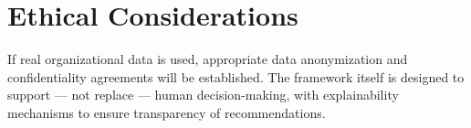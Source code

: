 
\section{Ethical Considerations}
\label{sec:ethics}

If real organizational data is used, appropriate data anonymization and confidentiality agreements will be established. The framework itself is designed to support — not replace — human decision-making, with explainability mechanisms to ensure transparency of recommendations.

